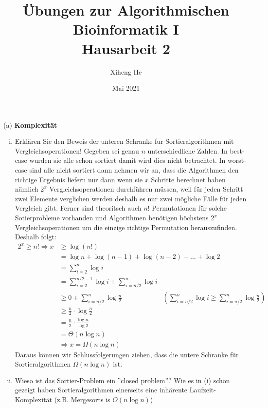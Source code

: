 \documentclass{article}
\title{Übungen zur Algorithmischen Bioinformatik I\\
Hausarbeit 2}
\author{Xiheng He }
\date{Mai 2021}
\begin{document}
\maketitle
\begin{flushleft}
(a) \textbf{Komplexität}
\newline
\begin{enumerate}[(i)]
\item Erklären Sie den Beweis der unteren Schranke fur Sortieralgorithmen mit Vergleichsoperationen!
\newline
Gegeben sei genau $n$ unterschiedliche Zahlen. In best-case wurden sie alle schon sortiert damit 
wird dies nicht betrachtet. In worst-case sind alle nicht sortiert dann nehmen wir an, dass die Algorithmen 
den richtige Ergebnis liefern nur dann wenn sie $x$ Schritte berechnet haben nämlich $2^x$ Vergleichsoperationen durchführen müssen,
weil für jeden Schritt zwei Elemente verglichen werden deshalb es nur zwei mögliche Fälle für jeden Vergleich gibt. 
\newline  
Ferner sind theoritsch auch $n!$ Permutationen für solche Sotierprobleme vorhanden und Algorithmen benötigen höchstens 
$2^x$ Vergleichsoperationen um die einzige richtige Permutation herauszufinden. Deshalb folgt:
\begin{align*}
    2^x \geq n! \Longrightarrow x &\geq \log(n!) \\
    &= \log n + \log(n-1) + \log(n-2) + \dots + \log 2 \\
    &= \sum_{i=2}^{n} \log i \\
    &= \sum_{i=2}^{n/2 - 1} \log i + \sum_{i=n/2}^{n} \log i \\
    & \geq 0 + \sum_{i=n/2}^{n} \log \frac{n}{2} \qquad \qquad \qquad
    (\sum_{i=n/2}^{n} \log i \geq \sum_{i=n/2}^{n} \log \frac{n}{2}) \\
    & \geq \frac{n}{2} \cdot \log \frac{n}{2} \\
    &= \frac{n}{2} \cdot \frac{\log n}{\log 2} \\
    &= \Theta(n\log n) \\
    & \Longrightarrow x = \Omega(n\log n)
\end{align*}
Daraus können wir Schlussfolgerungen ziehen, dass die untere Schranke für Sortieralgorithmen $\Omega(n\log n)$ ist. 
\item Wieso ist das Sortier-Problem ein ”closed problem”?
\newline
Wie es in (i) schon gezeigt haben Sortieralgorithmen einerseits eine inhärente Laufzeit-Komplexität (z.B. Mergesorts is $O(n\log n)$) 

\end{enumerate}
\end{flushleft}
\end{document}
